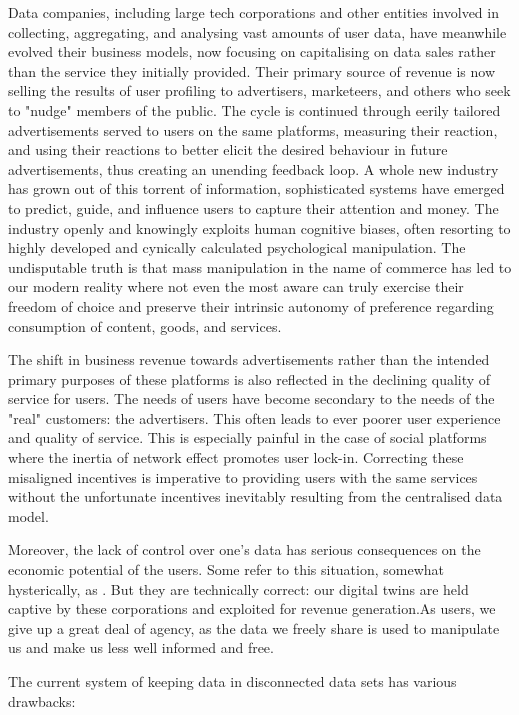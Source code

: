 Data companies, including large tech corporations and other entities involved in collecting, aggregating, and analysing vast amounts of user data, have meanwhile evolved their business models, now focusing on capitalising on data sales rather than the service they initially provided. Their primary source of revenue is now selling the results of user profiling to advertisers, marketeers, and others who seek to "nudge" members of the public. The cycle is continued through eerily tailored advertisements served to users on the same platforms, measuring their reaction, and using their reactions to better elicit the desired behaviour in future advertisements, thus creating an unending feedback loop. A whole new industry has grown out of this torrent of information, sophisticated systems have emerged to predict, guide, and influence users to capture their attention and money. The industry openly and knowingly exploits human cognitive biases, often resorting to highly developed and cynically calculated psychological manipulation. The undisputable truth is that mass manipulation in the name of commerce has led to our modern reality where not even the most aware can truly exercise their freedom of choice and preserve their intrinsic autonomy of preference regarding consumption of content, goods, and services.

The shift in business revenue towards advertisements rather than the intended primary purposes of these platforms is also reflected in the declining quality of service for users. The needs of users have become secondary to the needs of the "real" customers: the advertisers. This often leads to ever poorer user experience and quality of service. This is especially painful in the case of social platforms where the inertia of network effect promotes user lock-in. Correcting these misaligned incentives is imperative to providing users with the same services without the unfortunate incentives inevitably resulting from the centralised data model.

Moreover, the lack of control over one's data has serious consequences on the economic potential of the users. Some refer to this situation, somewhat hysterically, as . But they are technically correct: our digital twins are held captive by these corporations and exploited for revenue generation.As users, we give up a great deal of agency, as the data we freely share is used to manipulate us and make us less well informed and free. 

The current system of keeping data in disconnected data sets has various drawbacks: 

